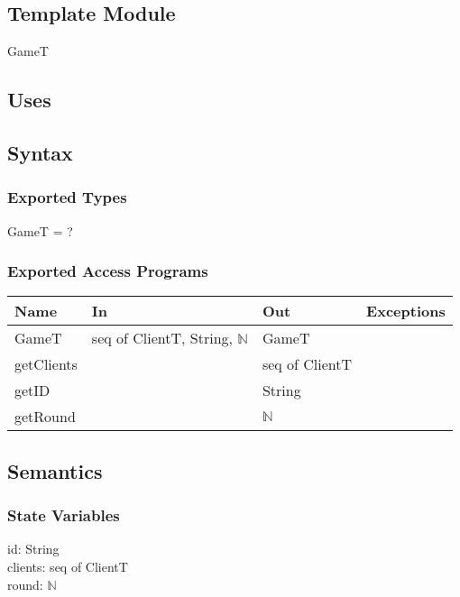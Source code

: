 \documentclass[12pt, titlepage]{article}
\begin{document}
\subsection{Template Module}

GameT

\subsection{Uses}

\subsection{Syntax}

\subsubsection{Exported Types}

GameT = ?

\subsubsection{Exported Access Programs}

\begin{center}
\begin{tabular}{ |  p{4cm} | p{3cm} |  p{3cm} | p{5cm} | }
\hline
\textbf{Name} & \textbf{In} & \textbf{Out} & \textbf{Exceptions} \\
\hline
GameT & seq of ClientT, String, $\mathbb{N}$  &  GameT &  \\
getClients & & seq of ClientT & \\
getID & & String & \\
getRound & & $\mathbb{N}$ & \\

\hline
\end{tabular}
\end{center}

\subsection{Semantics}

\subsubsection{State Variables}

id: String\\
clients: seq of ClientT\\
round:  $\mathbb{N}$\\
\end{document}
